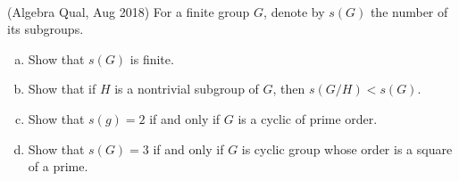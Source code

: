 \documentclass{article}
\begin{document}



\begin{problem} \\ 
    (Algebra Qual, Aug 2018) For a finite group $G$, denote by $s(G)$ the number of its subgroups.
    \begin{enumerate}[(a)]
        \item Show that $s(G)$ is finite.
        \item Show that if $H$ is a nontrivial subgroup of $G$, then $s(G/H) < s(G)$.
        \item Show that $s(g) = 2$ if and only if $G$ is a cyclic of prime order.
        \item Show that $s(G) = 3$ if and only if $G$ is cyclic group whose order is a square of a prime.
    \end{enumerate}
\end{problem}
\end{document}
